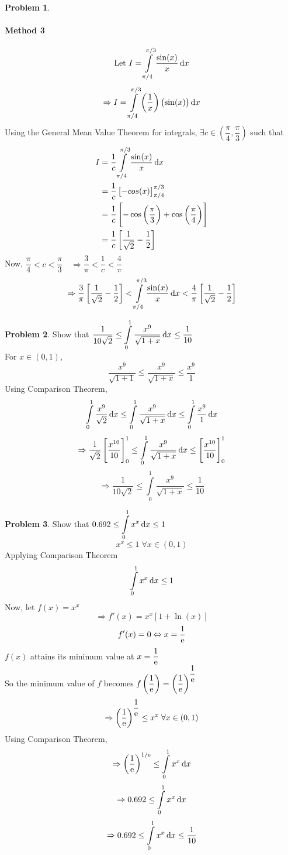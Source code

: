 \documentclass[14]{article}
\theoremstyle{definition}
\newtheorem{prob}{Problem}
\theoremstyle{case}
\begin{document}
\begin{prob}
\paragraph{Method 3}
\[\text{Let } I = \int\limits_{\pi/4}^{\pi/3} \dfrac{\sin(x)}{x} \dif x\]
\[\Rightarrow I = \int\limits_{\pi/4}^{\pi/3} \left( \dfrac1x\right) \left(\sin(x) \right)\dif x\]
Using the General Mean Value Theorem for integrals, $\exists c \in \left(\dfrac{\pi}{4}, \dfrac{\pi}{3} \right)$ such that
\begin{align*}
I &= \dfrac1{c} \int\limits_{\pi/4}^{\pi/3} \dfrac{\sin(x)}{x} \dif x\\
&= \dfrac1c \left[ -cos(x) \right]_{\pi/4}^{\pi/3}\\
&= \dfrac1c \left[ -\cos\left( \dfrac{\pi}3 \right) + \cos\left( \dfrac{\pi}{4} \right) \right]\\
&= \dfrac1c \left[\dfrac1{\sqrt2} - \dfrac12 \right]\\
\end{align*}
Now, $\dfrac{\pi}{4} < c < \dfrac{\pi}{3}\quad \Rightarrow \dfrac{3}{\pi} < \dfrac1c < \dfrac{4}{\pi}$
\[\Rightarrow \dfrac{3}{\pi} \left[\dfrac1{\sqrt2} - \dfrac12 \right] <\int\limits_{\pi/4}^{\pi/3} \dfrac{\sin(x)}{x} \dif x < \dfrac{4}{\pi}\left[\dfrac1{\sqrt2} - \dfrac12 \right]\]
\end{prob}
\pagebreak
\begin{prob}
Show that $\dfrac1{10\sqrt{2}} \leq \displaystyle\int\limits_0^1 \dfrac{x^9}{\sqrt{1+x}} \dif x \leq \dfrac1{10}$\\
For $x \in (0, 1)$,
\[ \dfrac{x^9}{\sqrt{1+1}} \leq \dfrac{x^9}{\sqrt{1+x}} \leq \dfrac{x^9}{1}\]
Using Comparison Theorem,
\[\int\limits_0^1 \dfrac{x^9}{\sqrt2} \dif x \leq \int\limits_0^1 \dfrac{x^9}{\sqrt{1+x}} \dif x \leq \int\limits_0^1 \dfrac{x^9}{1} \dif x\]
\[\Rightarrow \dfrac1{\sqrt2} \left[ \dfrac{x^{10}}{10} \right]_0^1 \leq \int\limits_0^1 \dfrac{x^9}{\sqrt{1+x}} \dif x \leq \left[\dfrac{x^{10}}{10}\right]_0^1\]
\[\Rightarrow \dfrac1{10\sqrt2} \leq \int\limits_0^1\dfrac{x^9}{\sqrt{1+x}} \leq \dfrac1{10}\]
\end{prob}
\begin{prob}
Show that $0.692 \leq \displaystyle\int\limits_0^1 x^x \dif x \leq 1$\\
\[x^x \leq 1 \; \forall x \in (0, 1)\]
Applying Comparison Theorem
\[\int\limits_0^1 x^x \dif x \leq 1\]
Now, let $f(x) = x^x$
\[\Rightarrow f'(x) = x^x \left[ 1 + \ln(x)\right]\]
\[f'(x) = 0 \Leftrightarrow x = \dfrac1{\rm e}\]
$f(x)$ attains its minimum value at $x = \dfrac1{\rm e}$\\
So the minimum value of $f$ becomes $f\left( \dfrac1{\rm e} \right) = \left(\dfrac{1}{\rm e}\right)^{\dfrac1{\rm e}}$
\[\Rightarrow \left(\dfrac{1}{\rm e}\right)^{\dfrac1{\rm e}} \leq x^x \; \forall x \in (0, 1)\]
Using Comparison Theorem,
\[\Rightarrow \left({\dfrac1{\rm e}}\right)^{1/{\rm e}} \leq \int\limits_0^1 x^x \dif x\]
\[\Rightarrow 0.692 \leq \int\limits_0^1 x^x \dif x\]
\[\Rightarrow 0.692 \leq \int\limits_0^1 x^x \dif x \leq \dfrac1{10}\]
\end{prob}
\end{document}
